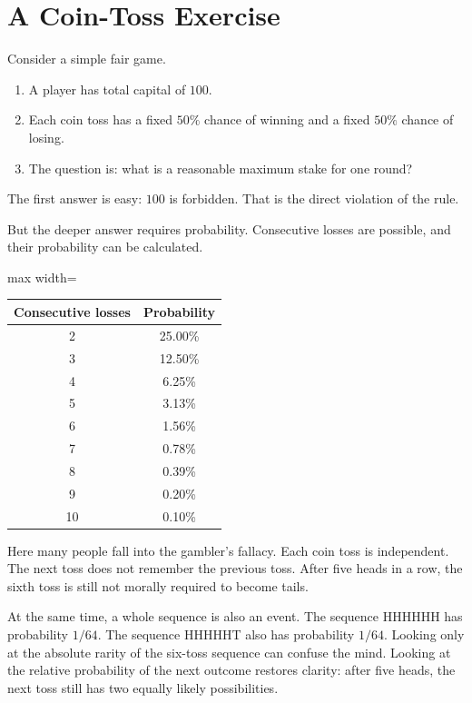 \section*{A Coin-Toss Exercise}

Consider a simple fair game.

\begin{enumerate}
\item A player has total capital of \(100\).
\item Each coin toss has a fixed \(50\%\) chance of winning and a fixed \(50\%\) chance of losing.
\item The question is: what is a reasonable maximum stake for one round?
\end{enumerate}

The first answer is easy: \(100\) is forbidden. That is the direct violation of the rule.

But the deeper answer requires probability. Consecutive losses are possible, and their probability can be calculated.

\begin{center}
\begin{adjustbox}{max width=\linewidth}
\begin{tabular}{cc}
\hline
Consecutive losses & Probability \\
\hline
2 & 25.00\% \\
3 & 12.50\% \\
4 & 6.25\% \\
5 & 3.13\% \\
6 & 1.56\% \\
7 & 0.78\% \\
8 & 0.39\% \\
9 & 0.20\% \\
10 & 0.10\% \\
\hline
\end{tabular}
\end{adjustbox}
\end{center}

Here many people fall into the gambler's fallacy. Each coin toss is independent. The next toss does not remember the previous toss. After five heads in a row, the sixth toss is still not morally required to become tails.

At the same time, a whole sequence is also an event. The sequence HHHHHH has probability \(1/64\). The sequence HHHHHT also has probability \(1/64\). Looking only at the absolute rarity of the six-toss sequence can confuse the mind. Looking at the relative probability of the next outcome restores clarity: after five heads, the next toss still has two equally likely possibilities.

